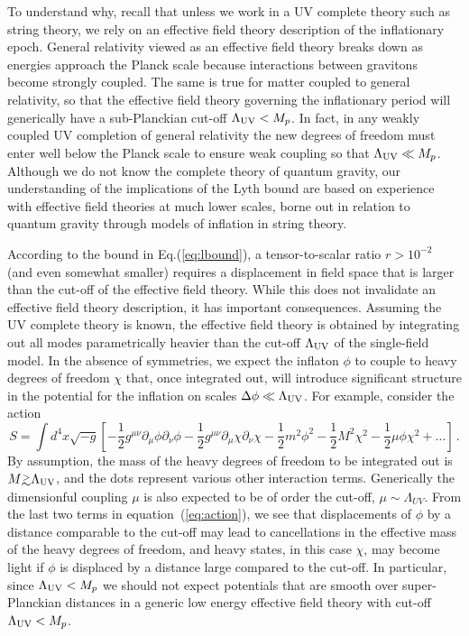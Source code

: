 To understand why, recall that unless we work in a UV complete theory such as string theory, we rely on an effective field theory description of the inflationary epoch. General relativity viewed as an effective field theory breaks down as energies approach the Planck scale because interactions between gravitons become strongly coupled. The same is true for matter coupled to general relativity, so that the effective field theory governing the inflationary period will generically have a sub-Planckian cut-off $\Lambda_{\rm UV}<M_p$. In fact, in any weakly coupled UV completion of general relativity the new degrees of freedom must enter well below the Planck scale to ensure weak coupling so that $\Lambda_{\rm UV}\ll M_p$. Although we do not know the complete theory of quantum gravity, our understanding of the implications of the Lyth bound are based on experience with effective field theories at much lower scales, borne out in relation to quantum gravity through models of inflation in string theory.

According to the bound in Eq.(\ref{eq:lbound}), a tensor-to-scalar ratio $r>10^{-2}$ (and even somewhat smaller) requires a displacement in field space that is larger than the cut-off of the effective field theory. While this does not invalidate an effective field theory description, it has important consequences. Assuming the UV complete theory is known, the effective field theory is obtained by integrating out all modes parametrically heavier than the cut-off $\Lambda_{\rm UV}$ of the single-field model. In the absence of symmetries, we expect the inflaton $\phi$ to couple to heavy degrees of freedom $\chi$ that, once integrated out, will introduce significant structure in the potential for the inflation on scales $\Delta\phi\ll \Lambda_{\rm UV}$. For example, consider the action
\begin{equation}\label{eq:action}
S=\int d^4x\sqrt{-g}\left[-\frac12g^{\mu\nu}\partial_\mu\phi\partial_\nu\phi-\frac12g^{\mu\nu}\partial_\mu\chi\partial_\nu\chi-\frac12m^2\phi^2-\frac12M^2\chi^2-\frac12\mu\phi\chi^2+\dots\right]\,.
\end{equation}
By assumption, the mass of the heavy degrees of freedom to be integrated out is $M\gtrsim\Lambda_{\rm UV}$, and the dots represent various other interaction terms. Generically the dimensionful coupling $\mu$ is also expected to be of order the cut-off, $\mu\sim\Lambda_{UV}$. From the last two terms in equation~(\ref{eq:action}), we see that displacements of $\phi$ by a distance comparable to the cut-off may lead to cancellations in the effective mass of the heavy degrees of freedom, and heavy states, in this case $\chi$, may become light if $\phi$ is displaced by a distance large compared to the cut-off. In particular, since $\Lambda_{\rm UV}<M_p$ we should not expect potentials that are smooth over super-Planckian distances in a generic low energy effective field theory with cut-off $\Lambda_{\rm UV}<M_p$. 

